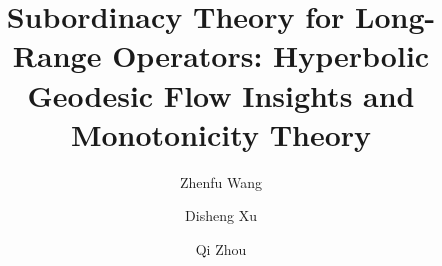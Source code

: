 \documentclass[11pt]{amsart}
\theoremstyle{remark}
\theoremstyle{definition}
\begin{document}
\title[Subordinacy Theory for Long-Range Operators]{Subordinacy Theory for Long-Range Operators: Hyperbolic Geodesic Flow Insights and Monotonicity Theory}


\author{Zhenfu Wang}
\address{Chern Institute of Mathematics and LPMC, Nankai University, Tianjin 300071, China}


\author{Disheng Xu}
\address{School of Science, Great Bay University and Great bay institute for advanced study, 
Songshan Lake International Innovation Entrepreneurship Community A5, Dongguan 523000, China}

\author{Qi Zhou}
\address{
Chern Institute of Mathematics and LPMC, Nankai University, Tianjin 300071, China
}
\end{document}
